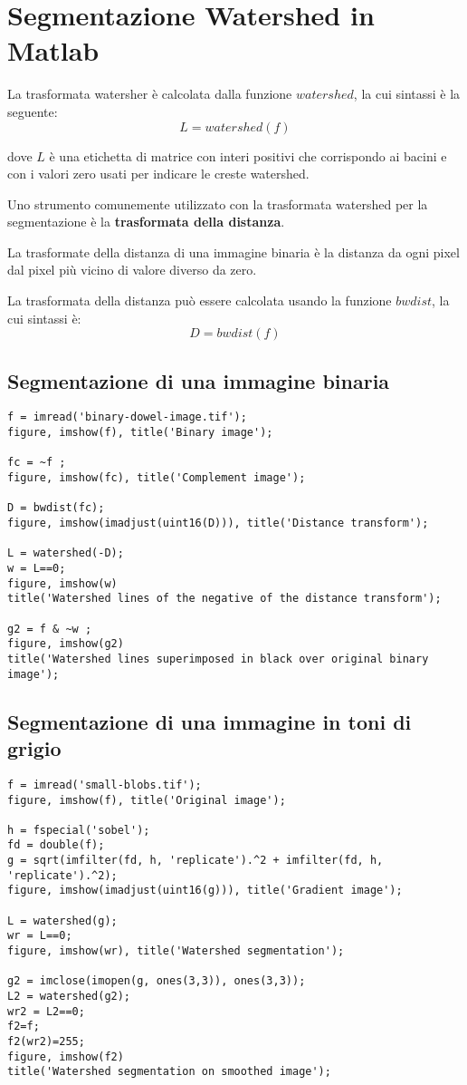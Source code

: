\chapter{Segmentazione Watershed in Matlab}
La trasformata watersher è calcolata dalla funzione $watershed$, la cui sintassi è la seguente:
$$
L = watershed(f)
$$

dove $L$ è una etichetta di matrice con interi positivi che corrispondo ai bacini e con i valori zero usati per indicare le creste watershed.

Uno strumento comunemente utilizzato con la trasformata watershed per la segmentazione è la \textbf{trasformata della distanza}.

La trasformate della distanza di una immagine binaria è la distanza da ogni pixel dal pixel più vicino di valore diverso da zero.

La trasformata della distanza può essere calcolata usando la funzione $bwdist$, la cui sintassi è:
$$
D = bwdist(f)
$$

\section{Segmentazione di una immagine binaria}
\begin{lstlisting}
f = imread('binary-dowel-image.tif');
figure, imshow(f), title('Binary image');

fc = ~f ;
figure, imshow(fc), title('Complement image');

D = bwdist(fc);
figure, imshow(imadjust(uint16(D))), title('Distance transform');

L = watershed(-D);
w = L==0;
figure, imshow(w)
title('Watershed lines of the negative of the distance transform');

g2 = f & ~w ;
figure, imshow(g2)
title('Watershed lines superimposed in black over original binary image');
\end{lstlisting}

\section{Segmentazione di una immagine in toni di grigio}
\begin{lstlisting}
f = imread('small-blobs.tif');
figure, imshow(f), title('Original image');

h = fspecial('sobel');
fd = double(f);
g = sqrt(imfilter(fd, h, 'replicate').^2 + imfilter(fd, h, 'replicate').^2);
figure, imshow(imadjust(uint16(g))), title('Gradient image');

L = watershed(g);
wr = L==0;
figure, imshow(wr), title('Watershed segmentation');

g2 = imclose(imopen(g, ones(3,3)), ones(3,3));
L2 = watershed(g2);
wr2 = L2==0;
f2=f;
f2(wr2)=255;
figure, imshow(f2)
title('Watershed segmentation on smoothed image');
\end{lstlisting}

